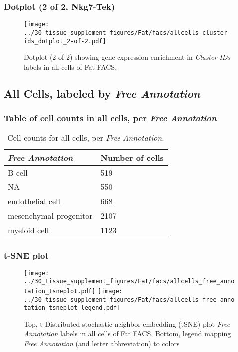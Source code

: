 \clearpage

\subsubsection{Dotplot (2 of 2, Nkg7-Tek)}
\begin{figure}[h]
\centering
\texttt{[image: ../30\_tissue\_supplement\_figures/Fat/facs/allcells\_cluster-ids\_dotplot\_2-of-2.pdf]}

\caption{ Dotplot (2 of 2)  showing gene expression enrichment in \emph{Cluster IDs} labels in all cells of Fat FACS. }
\end{figure}


\clearpage

\subsection{All Cells, labeled by \emph{Free Annotation}}
\subsubsection{Table of cell counts in all cells, per \emph{Free Annotation}}\begin{table}[h]
\centering
\label{my-label}
\begin{tabular}{@{}ll@{}}
\toprule

\emph{Free Annotation}& Number of cells \\ \midrule
B cell & 519 \\

NA & 550 \\

endothelial cell & 668 \\

mesenchymal progenitor & 2107 \\

myeloid cell & 1123 \\
\bottomrule
\end{tabular}
\caption{Cell counts for all cells, per \emph{Free Annotation}.}
\end{table}

\clearpage
\subsubsection{t-SNE plot}
\begin{figure}[h]
\centering
\texttt{[image: ../30\_tissue\_supplement\_figures/Fat/facs/allcells\_free\_annotation\_tsneplot.pdf]}
\texttt{[image: ../30\_tissue\_supplement\_figures/Fat/facs/allcells\_free\_annotation\_tsneplot\_legend.pdf]}
\caption{Top, t-Distributed stochastic neighbor embedding (tSNE) plot  \emph{Free Annotation} labels in all cells of Fat FACS. Bottom, legend mapping \emph{Free Annotation} (and letter abbreviation) to colors}
\end{figure}


